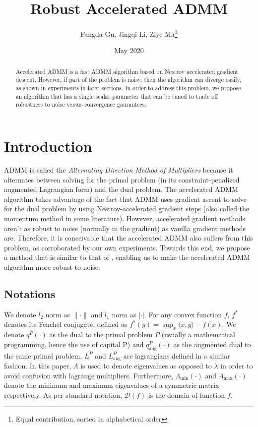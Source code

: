 \documentclass[11pt]{article}
\title{Robust Accelerated ADMM}
\author{Fangda Gu, Jingqi Li, Ziye Ma\footnote{Equal contribution, sorted in alphabetical order}}
\date{May 2020}
\theoremstyle{plain}
\theoremstyle{definition}
\theoremstyle{remark}
\begin{document}
\maketitle

\begin{abstract}
	Accelerated ADMM is a fast ADMM algorithm based on Nestrov accelerated gradient descent\cite{goldstein2014fast}. However, if part of the problem is noisy, then the algorithm can diverge easily, as shown in experiments in later sections. In order to address this problem, we propose an algorithm that has a single scalar parameter that can be tuned to trade off robustness to noise versus convergence gaurantees.
\end{abstract}

\section{Introduction}
\label{sec: introduction}

ADMM is called the \textit{Alternating Direction Method of Multipliers} because it alternates between solving for the primal problem (in its constraint-penalized augmented Lagrangian form) and the dual problem. The accelerated ADMM algorithm takes advantage of the fact that ADMM uses gradient ascent to solve for the dual problem by using Nestrov-accelerated gradient steps (also called the momentum method in some literature). However, accelerated gradient methods aren't as robust to noise (normally in the gradient) as vanilla gradient methods are. Therefore, it is conceivable that the accelerated ADMM also suffers from this problem, as corroborated by our own experiments. Towards this end, we propose a method that is similar to that of \cite{cyrus2018robust}, enabling us to make the accelerated ADMM algorithm more robust to noise.

\subsection{Notations}
We denote $l_2$ norm as $\| \cdot \|$ and $l_1$ norm as $| \cdot |$. For any convex function $f$, $f^*$ denotes its Fenchel conjugate, defined as $f^*(y) = \sup_x \langle x, y \rangle - f(x)$. We denote $q^P(\cdot)$ as the dual to the primal problem $P$ (usually a mathematical programming, hence the use of capital P) and $	q_{\text{aug}}^P(\cdot)$ as the augmented dual to the same primal problem. $L^P$ and $L_{\text{aug}}^P$ are lagrangians defined in a similar fashion. In this paper, $\Lambda$ is used to denote eigenvalues as opposed to $\lambda$ in order to avoid confusion with lagrange multipliers. Furthermore, $\Lambda_{\text{min}}(\cdot)$ and $\Lambda_{\text{max}}(\cdot)$ denote the minimum and maximum eigenvalues of a symmetric matrix respectively. As per standard notation, $\mathcal{D}(f)$ is the domain of function $f$.
\end{document}
